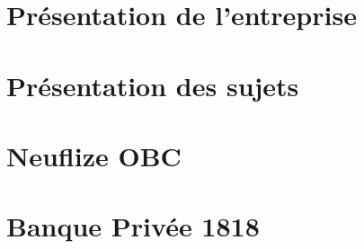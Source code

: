 \documentclass[11pt,twoside]{scrreprt}
\begin{document}
\chapter{Présentation de l'entreprise}

	


\chapter{Présentation des sujets}
	
	
	
\chapter{Neuflize OBC}

	
	

\chapter{Banque Privée 1818}

	
	
\end{document}

